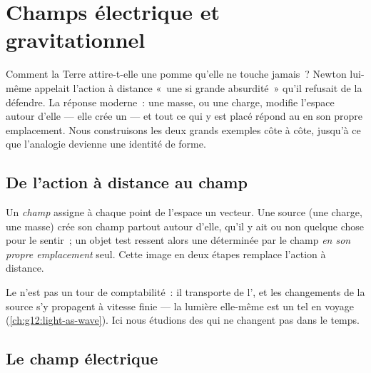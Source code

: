 \chapter{Champs électrique et gravitationnel}\label{ch:g11:electric-gravitational-fields}

Comment la Terre attire-t-elle une pomme qu'elle ne touche jamais~?
Newton lui-même appelait l'action à distance «~une si grande
absurdité~» qu'il refusait de la défendre. La réponse moderne~: une
masse, ou une charge, modifie l'espace autour d'elle --- elle crée un
\emph{} --- et tout ce qui y est placé
répond au  en son propre
emplacement. Nous construisons les deux grands exemples côte à côte,
jusqu'à ce que l'analogie devienne une identité de forme.

\section{De l'action à distance au champ}

\begin{definition}[Champ]\label{def:g11:electric-gravitational-fields:field}
Un \emph{champ} assigne à chaque point de l'espace un
vecteur. Une source (une charge, une masse) crée son champ partout
autour d'elle, qu'il y ait ou non quelque chose pour le sentir~; un
objet test ressent alors une 
déterminée par le champ \emph{en son propre emplacement} seul. Cette
image en deux étapes remplace l'action à distance.
\end{definition}

\begin{remark}
Le  n'est pas un tour de
comptabilité~: il transporte de l',
et les changements de la source s'y propagent à vitesse finie --- la
lumière elle-même est un tel
 en voyage
(\cref{ch:g12:light-as-wave}). Ici nous étudions des
 qui ne changent pas dans le
temps.
\end{remark}

\section{Le champ électrique}

